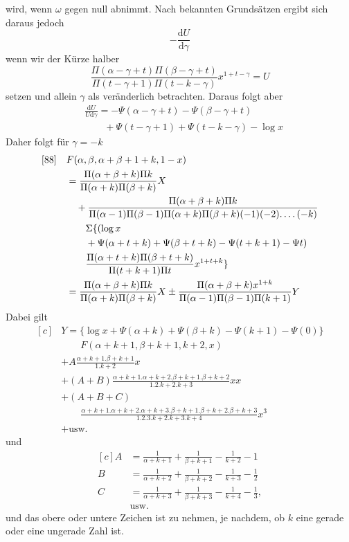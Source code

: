 wird, wenn $\omega$ gegen null abnimmt. Nach bekannten Grundsätzen ergibt sich daraus jedoch
\[
-\frac{\mathrm{d}U}{\mathrm{d}\gamma}
\]
wenn wir der Kürze halber
\[
\frac{\Pi(\alpha-\gamma+t)\Pi(\beta-\gamma+t)}{\Pi(t-\gamma+1)\Pi(t-k-\gamma)}x^{1+t-\gamma}=U
\]
setzen und allein $\gamma$ als veränderlich betrachten. Daraus folgt aber
\[
\begin{aligned}&\frac{\mathrm{d}U}{U\mathrm{d}\gamma}
=-\Psi(\alpha-\gamma+t)-\Psi(\beta-\gamma+t)\\&\qquad+\Psi(t-\gamma+1)+\Psi(t-k-\gamma)-\log x\end{aligned}
\]
Daher folgt für $\gamma=-k$
\[
\begin{aligned}[c]
[88]\quad &F(\alpha,\beta,\alpha+\beta+1+k,1-x)\\
&=\frac{\Pi(\alpha+\beta+k)\Pi k}{\Pi(\alpha+k)\Pi(\beta+k)}X\\
&\quad+\frac{\Pi(\alpha+\beta+k)\Pi k}{\Pi(\alpha-1)\Pi(\beta-1)\Pi(\alpha+k)\Pi(\beta+k)(-1)(-2)\ldotp\ldotp\ldotp\ldotp(-k)}\\&\qquad\Sigma\{(\log x\\
&\qquad+\Psi(\alpha+t+k)+\Psi(\beta+t+k)-\Psi(t+k+1)-\Psi t)
\\&\qquad\frac{\Pi(\alpha+t+k)\Pi(\beta+t+k)}{\Pi(t+k+1)\Pi t}x^{1+t+k}\}\\
&=\frac{\Pi(\alpha+\beta+k)\Pi k}{\Pi(\alpha+k)\Pi(\beta+k)}X
\pm\frac{\Pi(\alpha+\beta+k)x^{1+k}}{\Pi(\alpha-1)\Pi(\beta-1)\Pi(k+1)}Y
\end{aligned}
\]
Dabei gilt
\[
\begin{aligned}[c]
&Y=\{\log x+\Psi(\alpha+k)+\Psi(\beta+k)-\Psi(k+1)-\Psi(0)\}\\&\qquad F(\alpha+k+1,\beta+k+1,k+2,x)\\
&+A\frac{\alpha+k+1.\beta+k+1}{1. k+2}x\\
&+(A+B)\frac{\alpha+k+1.\alpha+k+2.\beta+k+1.\beta+k+2}{1.2. k+2. k+3}xx\\
&+(A+B+C)\\&\qquad\frac{\alpha+k+1.\alpha+k+2.\alpha+k+3.\beta+k+1.\beta+k+2.\beta+k+3}{1.2.3. k+2. k+3. k+4}x^3\\
&+\text{usw.}
\end{aligned}
\]
und
\[
\begin{aligned}[c]
A&=\frac{1}{\alpha+k+1}+\frac{1}{\beta+k+1}-\frac{1}{k+2}-1\\
B&=\frac{1}{\alpha+k+2}+\frac{1}{\beta+k+2}-\frac{1}{k+3}-\frac12\\
C&=\frac{1}{\alpha+k+3}+\frac{1}{\beta+k+3}-\frac{1}{k+4}-\frac13,\\
&\text{usw.}
\end{aligned}
\]
und das obere oder untere Zeichen ist zu nehmen, je nachdem, ob $k$ eine gerade oder eine ungerade Zahl ist.

